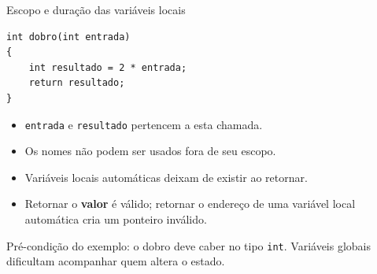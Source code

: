 \begin{frame}[fragile]{Escopo e duração das variáveis locais}
\begin{lstlisting}
int dobro(int entrada)
{
    int resultado = 2 * entrada;
    return resultado;
}
\end{lstlisting}
\begin{itemize}
\item \texttt{entrada} e \texttt{resultado} pertencem a esta chamada.
\item Os nomes não podem ser usados fora de seu escopo.
\item Variáveis locais automáticas deixam de existir ao retornar.
\item Retornar o \textbf{valor} é válido; retornar o endereço de uma variável local automática cria um ponteiro inválido.
\end{itemize}
\small Pré-condição do exemplo: o dobro deve caber no tipo \texttt{int}. Variáveis globais dificultam acompanhar quem altera o estado.
\end{frame}
